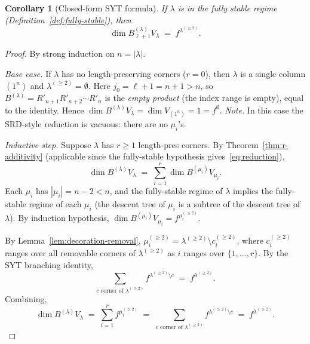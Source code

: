 \documentclass[11pt]{article}
\newtheorem{corollary}[theorem]{Corollary}
\theoremstyle{definition}
\begin{document}
\begin{corollary}[Closed-form SYT formula]\label{cor:syt-formula}
If $\lambda$ is in the fully stable regime
(Definition~\ref{def:fully-stable}), then
\[
   \dim B_{\ell+1}^{(\lambda)} V_\lambda \;=\; f^{\lambda^{(\ge 2)}}.
\]
\end{corollary}

\begin{proof}
By strong induction on $n = |\lambda|$.

\emph{Base case.} If $\lambda$ has no length-preserving corners
($r = 0$), then $\lambda$ is a single column $(1^n)$ and
$\lambda^{(\ge 2)} = \emptyset$. Here $j_0 = \ell + 1 = n + 1 > n$,
so $B^{(\lambda)} = R'_{n+1} R'_{n+2} \cdots R'_n$ is the
\emph{empty product} (the index range is empty), equal to the
identity. Hence $\dim B^{(\lambda)} V_\lambda = \dim V_{(1^n)} = 1
= f^{\emptyset}$. \emph{Note.} In this case the SRD-style reduction
is vacuous: there are no $\mu_i$'s.

\emph{Inductive step.} Suppose $\lambda$ has $r \ge 1$ length-pres
corners. By Theorem~\ref{thm:r-additivity} (applicable since the
fully-stable hypothesis gives~\eqref{eq:reduction}),
\[
   \dim B^{(\lambda)} V_\lambda \;=\; \sum_{i=1}^r \dim B^{(\mu_i)} V_{\mu_i}.
\]
Each $\mu_i$ has $|\mu_i| = n - 2 < n$, and the fully-stable
regime of $\lambda$ implies the fully-stable regime of each $\mu_i$
(the descent tree of $\mu_i$ is a subtree of the descent tree of
$\lambda$). By induction hypothesis,
$\dim B^{(\mu_i)} V_{\mu_i} = f^{\mu_i^{(\ge 2)}}$.

By Lemma~\ref{lem:decoration-removal},
$\mu_i^{(\ge 2)} = \lambda^{(\ge 2)} \setminus c_i^{(\ge 2)}$, where
$c_i^{(\ge 2)}$ ranges over all removable corners of
$\lambda^{(\ge 2)}$ as $i$ ranges over $\{1, \ldots, r\}$. By the
SYT branching identity,
\[
   \sum_{c \text{ corner of } \lambda^{(\ge 2)}} f^{\lambda^{(\ge 2)} \setminus c}
   \;=\; f^{\lambda^{(\ge 2)}}.
\]
Combining,
\[
   \dim B^{(\lambda)} V_\lambda \;=\; \sum_{i=1}^r f^{\mu_i^{(\ge 2)}}
   \;=\; \sum_{c \text{ corner of } \lambda^{(\ge 2)}}
   f^{\lambda^{(\ge 2)} \setminus c} \;=\; f^{\lambda^{(\ge 2)}}.
\]
\end{proof}
\end{document}
